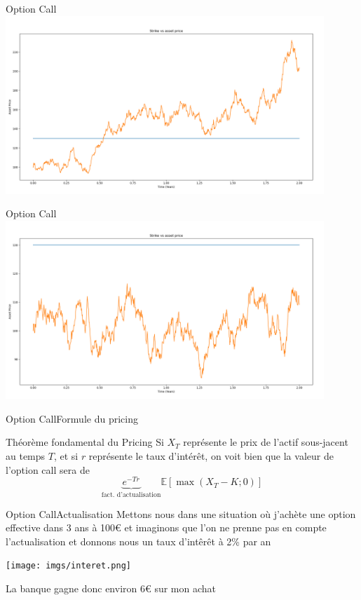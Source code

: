 \documentclass{beamer}
\newcommand{\1}{\mathmybb{1}}
\begin{document}
\begin{frame}{Option Call}
  \includegraphics[width=12cm]{imgs/strike.png}
\end{frame}
\begin{frame}{Option Call}
  \includegraphics[width=12cm]{imgs/nostrike.png}
\end{frame}
\begin{frame}{Option Call}{Formule du pricing}
\begin{block}{Théorème fondamental du Pricing}
    Si $X_T$  représente le prix de l'actif sous-jacent au temps $T$, et si $r$ représente le taux d'intérêt, on voit bien que la valeur de l'option call sera de
    \begin{equation} \label{tfp}
      \underbrace{e^{-Tr}}_{\text{fact. d'actualisation}}\mathbb{E}\left[ \max \left(X_{T} - K; 0 \right) \right]
    \end{equation}
  \end{block}
\end{frame}
\begin{frame}{Option Call}{Actualisation}
  Mettons nous dans une situation où j'achète une option effective dans 3 ans à 100€ et imaginons que l'on ne prenne pas en compte l'actualisation et donnons nous un taux d'intêrêt à 2\% par an
  \pause
  \begin{center}
    \texttt{[image: imgs/interet.png]}
    \end{center}
  \pause
  La banque gagne donc environ 6€ sur mon achat
\end{frame}
\end{document}
